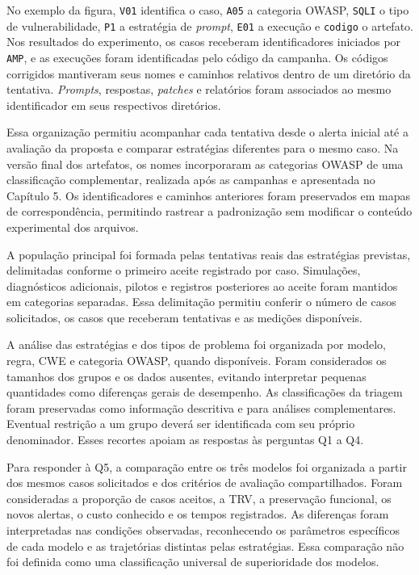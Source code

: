 No exemplo da figura, \texttt{V01} identifica o caso, \texttt{A05} a categoria OWASP, \texttt{SQLI} o tipo de vulnerabilidade, \texttt{P1} a estratégia de \textit{prompt}, \texttt{E01} a execução e \texttt{codigo} o artefato. Nos resultados do experimento, os casos receberam identificadores iniciados por \texttt{AMP}, e as execuções foram identificadas pelo código da campanha. Os códigos corrigidos mantiveram seus nomes e caminhos relativos dentro de um diretório da tentativa. \textit{Prompts}, respostas, \textit{patches} e relatórios foram associados ao mesmo identificador em seus respectivos diretórios.

Essa organização permitiu acompanhar cada tentativa desde o alerta inicial até a avaliação da proposta e comparar estratégias diferentes para o mesmo caso. Na versão final dos artefatos, os nomes incorporaram as categorias OWASP de uma classificação complementar, realizada após as campanhas e apresentada no Capítulo 5. Os identificadores e caminhos anteriores foram preservados em mapas de correspondência, permitindo rastrear a padronização sem modificar o conteúdo experimental dos arquivos.

A população principal foi formada pelas tentativas reais das estratégias previstas, delimitadas conforme o primeiro aceite registrado por caso. Simulações, diagnósticos adicionais, pilotos e registros posteriores ao aceite foram mantidos em categorias separadas. Essa delimitação permitiu conferir o número de casos solicitados, os casos que receberam tentativas e as medições disponíveis.

A análise das estratégias e dos tipos de problema foi organizada por modelo, regra, CWE e categoria OWASP, quando disponíveis. Foram considerados os tamanhos dos grupos e os dados ausentes, evitando interpretar pequenas quantidades como diferenças gerais de desempenho. As classificações da triagem foram preservadas como informação descritiva e para análises complementares. Eventual restrição a um grupo deverá ser identificada com seu próprio denominador. Esses recortes apoiam as respostas às perguntas Q1 a Q4.

Para responder à Q5, a comparação entre os três modelos foi organizada a partir dos mesmos casos solicitados e dos critérios de avaliação compartilhados. Foram consideradas a proporção de casos aceitos, a TRV, a preservação funcional, os novos alertas, o custo conhecido e os tempos registrados. As diferenças foram interpretadas nas condições observadas, reconhecendo os parâmetros específicos de cada modelo e as trajetórias distintas pelas estratégias. Essa comparação não foi definida como uma classificação universal de superioridade dos modelos.

